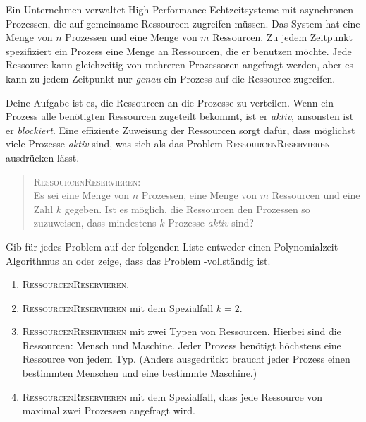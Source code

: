 \documentclass{uebung_cs}
\begin{document}
\begin{exercise}[Ressourcenmanagement]
	Ein Unternehmen verwaltet High-Performance Echtzeitsysteme mit asynchronen Prozessen, die auf gemeinsame Ressourcen zugreifen müssen. Das System hat eine Menge von $n$ Prozessen und eine Menge von $m$ Ressourcen. 
	Zu jedem Zeitpunkt spezifiziert ein Prozess eine Menge an Ressourcen, die er benutzen möchte. Jede Ressource kann gleichzeitig von mehreren Prozessoren angefragt werden, aber es kann zu jedem Zeitpunkt nur \emph{genau} ein Prozess auf die Ressource zugreifen. 
	
	Deine Aufgabe ist es, die Ressourcen an die Prozesse zu verteilen. Wenn ein Prozess alle benötigten Ressourcen zugeteilt bekommt, ist er \textit{aktiv}, ansonsten ist er \textit{blockiert}. Eine effiziente Zuweisung der Ressourcen sorgt dafür, dass möglichst viele Prozesse \textit{aktiv} sind, was sich als das Problem \textsc{RessourcenReservieren} ausdrücken lässt.
	 \begin{quote}
	 \textsc{RessourcenReservieren}:\\
	 Es sei eine Menge von $n$ Prozessen, eine Menge von $m$ Ressourcen und eine Zahl $k$ gegeben. Ist es möglich, die Ressourcen den Prozessen so zuzuweisen, dass mindestens $k$ Prozesse \textit{aktiv} sind?
	 \end{quote}
	 
	Gib für jedes Problem auf der folgenden Liste entweder einen Polynomialzeit-Algorithmus an oder zeige, dass das Problem \NP-vollständig ist.
	 \begin{enumerate}
	 	\item \textsc{RessourcenReservieren}.
	 	\item \textsc{RessourcenReservieren} mit dem Spezialfall $k=2$.
	 	\item \textsc{RessourcenReservieren} mit zwei Typen von Ressourcen. Hierbei sind die Ressourcen: Mensch und Maschine. Jeder Prozess benötigt höchstens eine Ressource von jedem Typ. (Anders ausgedrückt braucht jeder Prozess einen bestimmten Menschen und eine bestimmte Maschine.)
	 	\item \textsc{RessourcenReservieren} mit dem Spezialfall, dass jede Ressource von maximal zwei Prozessen angefragt wird.	 	
	 \end{enumerate}
\end{exercise}
\end{document}
